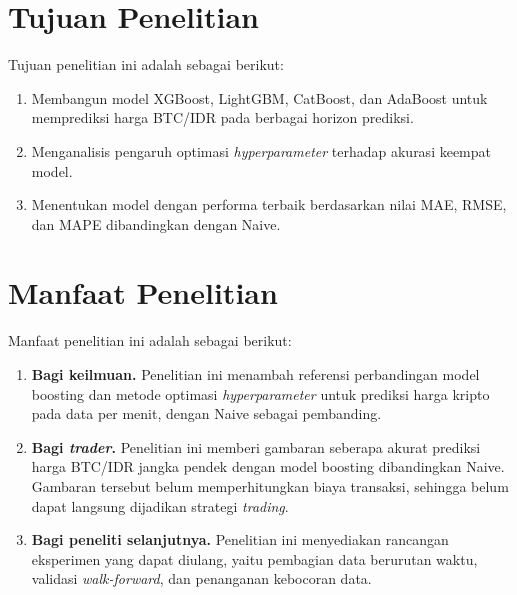 \section{Tujuan Penelitian}
Tujuan penelitian ini adalah sebagai berikut:
\begin{enumerate}
  \item\label{tujuan:1} Membangun model XGBoost, LightGBM, CatBoost, dan
        AdaBoost untuk memprediksi harga BTC/IDR pada berbagai
        horizon prediksi.
  \item\label{tujuan:2} Menganalisis pengaruh optimasi
        \textit{hyperparameter} terhadap akurasi keempat model.
  \item\label{tujuan:3} Menentukan model dengan performa terbaik berdasarkan
        nilai MAE, RMSE, dan MAPE dibandingkan dengan Naive.
\end{enumerate}

\section{Manfaat Penelitian}
Manfaat penelitian ini adalah sebagai berikut:
\begin{enumerate}
  \item \textbf{Bagi keilmuan.} Penelitian ini menambah referensi
        perbandingan model boosting dan metode optimasi
        \textit{hyperparameter} untuk prediksi harga kripto pada data per
        menit, dengan Naive sebagai pembanding.
  \item \textbf{Bagi \textit{trader}.} Penelitian ini memberi gambaran
        seberapa akurat prediksi harga BTC/IDR jangka pendek dengan model
        boosting dibandingkan Naive. Gambaran tersebut belum memperhitungkan
        biaya transaksi, sehingga belum dapat langsung dijadikan strategi
        \textit{trading}.
  \item \textbf{Bagi peneliti selanjutnya.} Penelitian ini menyediakan
        rancangan eksperimen yang dapat diulang, yaitu pembagian data
        berurutan waktu, validasi \textit{walk-forward}, dan penanganan
        kebocoran data.
\end{enumerate}

